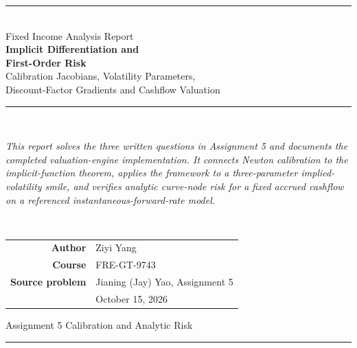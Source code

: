 \documentclass[11pt]{article}
\numberwithin{equation}{section}
\begin{document}
\setlength{\abovedisplayskip}{7pt}
\setlength{\belowdisplayskip}{7pt}
\setlength{\jot}{2pt}
\hypersetup{pageanchor=false}

\begin{titlepage}
\thispagestyle{empty}
\centering
\vspace*{0.55in}
{\color{NYUviolet}\rule{\textwidth}{2.2pt}}\\[10pt]
{\sffamily\fontsize{16}{19}\selectfont\color{inkgrey}Fixed Income Analysis Report}\\[14pt]
{\sffamily\bfseries\fontsize{25}{30}\selectfont\color{NYUviolet}
Implicit Differentiation and\\[3pt]First-Order Risk}\\[14pt]
{\sffamily\fontsize{15}{18}\selectfont\color{inkgrey}
Calibration Jacobians, Volatility Parameters,\\[3pt]
Discount-Factor Gradients and Cashflow Valuation}\\[10pt]
{\color{NYUviolet}\rule{\textwidth}{2.2pt}}\\[26pt]
\begin{minipage}{0.88\textwidth}
\centering\itshape\small\color{inkgrey}
This report solves the three written questions in Assignment 5 and documents
the completed valuation-engine implementation. It connects Newton calibration
to the implicit-function theorem, applies the framework to a three-parameter
implied-volatility smile, and verifies analytic curve-node risk for a fixed
accrued cashflow on a referenced instantaneous-forward-rate model.
\end{minipage}\\[34pt]
\begin{tabular}{rl}
\sffamily\bfseries Author & Ziyi Yang\\[3pt]
\sffamily\bfseries Course & FRE-GT-9743\\[3pt]
\sffamily\bfseries Source problem & Jianing (Jay) Yao, Assignment 5\\[3pt]
 & October 15, 2026
\end{tabular}
\vfill
{\sffamily\small\color{inkgrey}Assignment 5 \quad\textbullet\quad Calibration and Analytic Risk}\\[2pt]
{\color{NYUviolet}\rule{\textwidth}{1.2pt}}
\end{titlepage}
\hypersetup{pageanchor=true}
\end{document}
